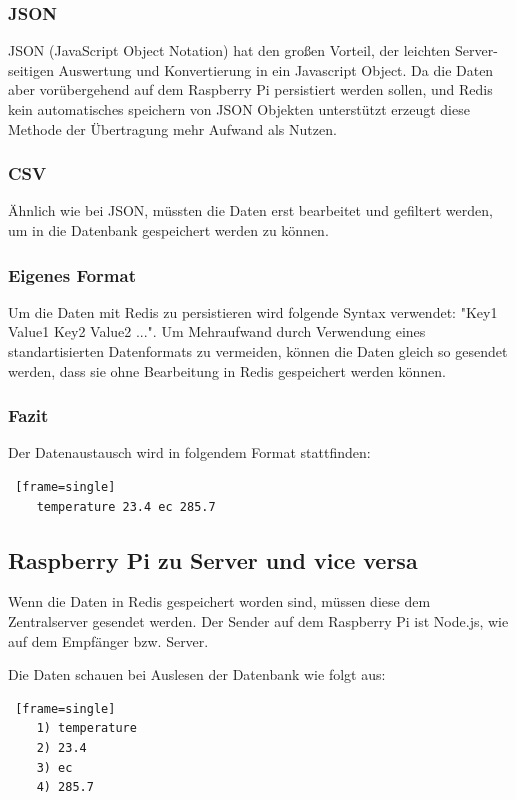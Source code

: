 \documentclass[11pt]{article}
\begin{document}
\subsubsection{JSON}
JSON (JavaScript Object Notation) hat den gro{\ss}en Vorteil, der leichten Server-seitigen Auswertung und Konvertierung in ein Javascript Object. Da die Daten aber vor\"ubergehend auf dem Raspberry Pi persistiert werden sollen, und Redis kein automatisches speichern von JSON Objekten unterst\"utzt erzeugt diese Methode der \"Ubertragung mehr Aufwand als Nutzen.
\subsubsection{CSV}
\"Ahnlich wie bei JSON, m\"ussten die Daten erst bearbeitet und gefiltert werden, um in die Datenbank gespeichert werden zu k\"onnen.
\subsubsection{Eigenes Format}
Um die Daten mit Redis zu persistieren wird folgende Syntax verwendet: "Key1 Value1 Key2 Value2 ...". Um Mehraufwand durch Verwendung eines standartisierten Datenformats zu vermeiden, k\"onnen die Daten gleich so gesendet werden, dass sie ohne Bearbeitung in Redis gespeichert werden k\"onnen.
\subsubsection{Fazit}
Der Datenaustausch wird in folgendem Format stattfinden:
\begin{lstlisting} [frame=single]
	temperature 23.4 ec 285.7
\end{lstlisting}

\subsection{Raspberry Pi zu Server und vice versa}
Wenn die Daten in Redis gespeichert worden sind, m\"ussen diese dem Zentralserver gesendet werden. Der Sender auf dem Raspberry Pi ist Node.js, wie auf dem Empf\"anger bzw. Server.

Die Daten schauen bei Auslesen der Datenbank wie folgt aus:
\begin{lstlisting} [frame=single]
	1) temperature
	2) 23.4
	3) ec
	4) 285.7
\end{lstlisting}
\end{document}
